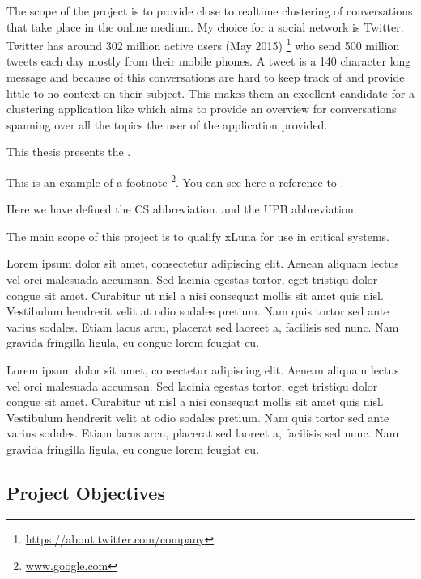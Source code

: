 The scope of the project \textbf{\project} is to provide close to realtime 
clustering of conversations that take place in the online medium. My choice for
a social network is Twitter. Twitter has around 302 million active users (May 2015)
\footnote{\url{https://about.twitter.com/company}} who send 500 million tweets
each day mostly from their mobile phones. A tweet is a 140 character long message
and because of this conversations are hard to keep track of and provide little to
no context on their subject. This makes them an excellent candidate for a clustering application like \textbf{\project} which aims to provide an overview for  
conversations spanning over all the topics the user of the application provided.


This thesis presents the \textbf{\project}.

This is an example of a footnote \footnote{\url{www.google.com}}. You can see here a reference to .

Here we have defined the CS abbreviation. and the UPB abbreviation.

The main scope of this project is to qualify xLuna for use in critical systems.


Lorem ipsum dolor sit amet, consectetur adipiscing elit. Aenean aliquam lectus vel orci malesuada accumsan. Sed lacinia egestas tortor, eget tristiqu dolor congue sit amet. Curabitur ut nisl a nisi consequat mollis sit amet quis nisl. Vestibulum hendrerit velit at odio sodales pretium. Nam quis tortor sed ante varius sodales. Etiam lacus arcu, placerat sed laoreet a, facilisis sed nunc. Nam gravida fringilla ligula, eu congue lorem feugiat eu.

Lorem ipsum dolor sit amet, consectetur adipiscing elit. Aenean aliquam lectus vel orci malesuada accumsan. Sed lacinia egestas tortor, eget tristiqu dolor congue sit amet. Curabitur ut nisl a nisi consequat mollis sit amet quis nisl. Vestibulum hendrerit velit at odio sodales pretium. Nam quis tortor sed ante varius sodales. Etiam lacus arcu, placerat sed laoreet a, facilisis sed nunc. Nam gravida fringilla ligula, eu congue lorem feugiat eu.


\subsection{Project Objectives}
\label{sub-sec:proj-objectives}

